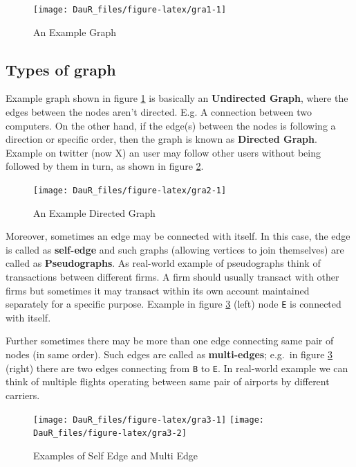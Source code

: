 \documentclass[
]{book}
\begin{document}
\begin{figure}

{\centering \texttt{[image: DauR\_files/figure-latex/gra1-1]} 

}

\caption{An Example Graph}\label{fig:gra1}
\end{figure}

\hypertarget{types-of-graph}{%
\subsection*{Types of graph}\label{types-of-graph}}

Example graph shown in figure \ref{fig:gra1} is basically an \textbf{Undirected Graph}, where the edges between the nodes aren't directed. E.g. A connection between two computers. On the other hand, if the edge(s) between the nodes is following a direction or specific order, then the graph is known as \textbf{Directed Graph}. Example on twitter (now X) an user may follow other users without being followed by them in turn, as shown in figure \ref{fig:gra2}.

\begin{figure}

{\centering \texttt{[image: DauR\_files/figure-latex/gra2-1]} 

}

\caption{An Example Directed Graph}\label{fig:gra2}
\end{figure}

Moreover, sometimes an edge may be connected with itself. In this case, the edge is called as \textbf{self-edge} and such graphs (allowing vertices to join themselves) are called as \textbf{Pseudographs}. As real-world example of pseudographs think of transactions between different firms. A firm should usually transact with other firms but sometimes it may transact within its own account maintained separately for a specific purpose. Example in figure \ref{fig:gra3} (left) node \texttt{E} is connected with itself.

Further sometimes there may be more than one edge connecting same pair of nodes (in same order). Such edges are called as \textbf{multi-edges}; e.g.~in figure \ref{fig:gra3} (right) there are two edges connecting from \texttt{B} to \texttt{E}. In real-world example we can think of multiple flights operating between same pair of airports by different carriers.

\begin{figure}

{\centering \texttt{[image: DauR\_files/figure-latex/gra3-1]} \texttt{[image: DauR\_files/figure-latex/gra3-2]} 

}

\caption{Examples of Self Edge and Multi Edge}\label{fig:gra3}
\end{figure}
\end{document}
